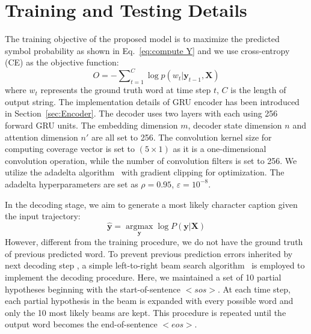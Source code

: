 \documentclass[a4paper,conference]{IEEEtran}
\begin{document}


\section{Training and Testing Details}
\label{sec:Training and Testing Details}

The training objective of the proposed model is to maximize the predicted symbol probability as shown in Eq.~\eqref{eq:compute Y} and we use cross-entropy (CE) as the objective function:
\begin{equation}\label{eq:objective}
  O = - \sum\nolimits_{t=1}^C \log p({w_t}|{\mathbf{y}_{t-1},\mathbf{X}})
\end{equation}
where $w_t$ represents the ground truth word at time step $t$, $C$ is the length of output string. The implementation details of GRU encoder has been introduced in Section~\ref{sec:Encoder}. The decoder uses two layers with each using 256 forward GRU units. The embedding dimension $m$, decoder state dimension $n$ and attention dimension $n'$ are all set to 256. The convolution kernel size for computing coverage vector is set to $(5 \times 1)$ as it is a one-dimensional convolution operation, while the number of convolution filters is set to 256. We utilize the adadelta algorithm~\cite{zeiler2012adadelta} with gradient clipping for optimization. The adadelta hyperparameters are set as $\rho = 0.95$, $\varepsilon = {10^{ - 8}}$.

In the decoding stage, we aim to generate a most likely character caption given the input trajectory:
\begin{equation}\label{eq:decoding objective}
  {\mathbf{\hat y}} = \mathop {\arg \max }\limits_{\mathbf{y}} \log P\left( {{\mathbf{y}}|{\mathbf{X}}} \right)
\end{equation}
However, different from the training procedure, we do not have the ground truth of previous predicted word. To prevent previous prediction errors inherited by next decoding step , a simple left-to-right beam search algorithm~\cite{cho2015natural} is employed to implement the decoding procedure. Here, we maintained a set of 10 partial hypotheses beginning with the start-of-sentence $<sos>$. At each time step, each partial hypothesis in the beam is expanded with every possible word and only the 10 most likely beams are kept. This procedure is repeated until the output word becomes the end-of-sentence $<eos>$.
\end{document}
